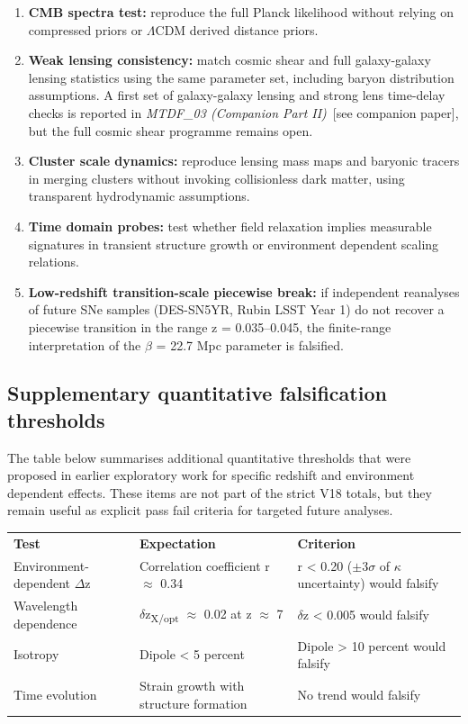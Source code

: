 \documentclass[11pt,a4paper]{article}
\begin{document}
\begin{enumerate}
  \item \textbf{CMB spectra test:} reproduce the full Planck likelihood without relying on compressed priors or $\Lambda$CDM derived distance priors.
  \item \textbf{Weak lensing consistency:} match cosmic shear and full galaxy-galaxy lensing statistics using the same parameter set, including baryon distribution assumptions. A first set of galaxy-galaxy lensing and strong lens time-delay checks is reported in \textit{MTDF\_\allowbreak{}03 (Companion Part II)}~[see companion paper], but the full cosmic shear programme remains open.
  \item \textbf{Cluster scale dynamics:} reproduce lensing mass maps and baryonic tracers in merging clusters without invoking collisionless dark matter, using transparent hydrodynamic assumptions.
  \item \textbf{Time domain probes:} test whether field relaxation implies measurable signatures in transient structure growth or environment dependent scaling relations.
  \item \textbf{Low-redshift transition-scale piecewise break:} if independent reanalyses of future SNe samples (DES-SN5YR, Rubin LSST Year 1) do not recover a piecewise transition in the range z = 0.035--0.045, the finite-range interpretation of the $\beta$ = 22.7 Mpc parameter is falsified.
\end{enumerate}

\subsection{Supplementary quantitative falsification thresholds}
The table below summarises additional quantitative thresholds that were proposed in earlier exploratory work for specific redshift and environment dependent effects. These items are not part of the strict V18 totals, but they remain useful as explicit pass fail criteria for targeted future analyses.

\begin{table}[H]
\centering
\footnotesize
\begin{tabularx}{\linewidth}{l>{\RaggedRight\arraybackslash}X>{\RaggedRight\arraybackslash}X}
\toprule
\textbf{Test} & \textbf{Expectation} & \textbf{Criterion} \tabularnewline
Environment-dependent $\Delta$z & Correlation coefficient r $\approx$ 0.34 & r < 0.20 ($\pm$3$\sigma$ of $\kappa$ uncertainty) would falsify \tabularnewline
Wavelength dependence & $\delta$z\textsubscript{X/\allowbreak{}opt} $\approx$ 0.02 at z $\approx$ 7 & $\delta$z < 0.005 would falsify \tabularnewline
Isotropy & Dipole < 5 percent & Dipole > 10 percent would falsify \tabularnewline
Time evolution & Strain growth with structure formation & No trend would falsify \tabularnewline
\bottomrule
\end{tabularx}
\end{table}
\end{document}
